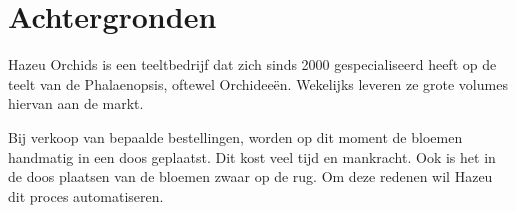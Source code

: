 \section{Achtergronden}

Hazeu Orchids is een teeltbedrijf dat zich sinds 2000 gespecialiseerd heeft op de teelt van de Phalaenopsis, oftewel Orchideeën. Wekelijks leveren ze grote volumes hiervan aan de markt.

\bigskip

Bij verkoop van bepaalde bestellingen, worden op dit moment de bloemen handmatig in een doos geplaatst. Dit kost veel tijd en mankracht. Ook is het in de doos plaatsen van de bloemen zwaar op de rug. Om deze redenen wil Hazeu dit proces automatiseren.

\newpage